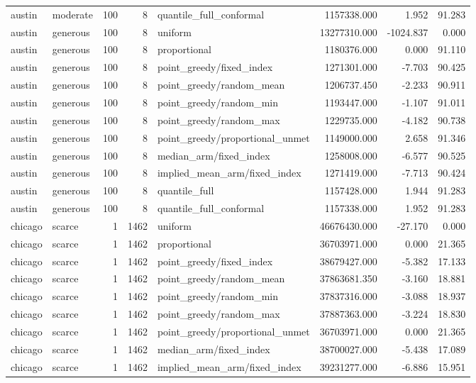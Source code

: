 \begin{tabular}{llrrlrrr}
austin & moderate & 100 & 8 & quantile\_full\_conformal & 1157338.000 & 1.952 & 91.283 \\
austin & generous & 100 & 8 & uniform & 13277310.000 & -1024.837 & 0.000 \\
austin & generous & 100 & 8 & proportional & 1180376.000 & 0.000 & 91.110 \\
austin & generous & 100 & 8 & point\_greedy/fixed\_index & 1271301.000 & -7.703 & 90.425 \\
austin & generous & 100 & 8 & point\_greedy/random\_mean & 1206737.450 & -2.233 & 90.911 \\
austin & generous & 100 & 8 & point\_greedy/random\_min & 1193447.000 & -1.107 & 91.011 \\
austin & generous & 100 & 8 & point\_greedy/random\_max & 1229735.000 & -4.182 & 90.738 \\
austin & generous & 100 & 8 & point\_greedy/proportional\_unmet & 1149000.000 & 2.658 & 91.346 \\
austin & generous & 100 & 8 & median\_arm/fixed\_index & 1258008.000 & -6.577 & 90.525 \\
austin & generous & 100 & 8 & implied\_mean\_arm/fixed\_index & 1271419.000 & -7.713 & 90.424 \\
austin & generous & 100 & 8 & quantile\_full & 1157428.000 & 1.944 & 91.283 \\
austin & generous & 100 & 8 & quantile\_full\_conformal & 1157338.000 & 1.952 & 91.283 \\
chicago & scarce & 1 & 1462 & uniform & 46676430.000 & -27.170 & 0.000 \\
chicago & scarce & 1 & 1462 & proportional & 36703971.000 & 0.000 & 21.365 \\
chicago & scarce & 1 & 1462 & point\_greedy/fixed\_index & 38679427.000 & -5.382 & 17.133 \\
chicago & scarce & 1 & 1462 & point\_greedy/random\_mean & 37863681.350 & -3.160 & 18.881 \\
chicago & scarce & 1 & 1462 & point\_greedy/random\_min & 37837316.000 & -3.088 & 18.937 \\
chicago & scarce & 1 & 1462 & point\_greedy/random\_max & 37887363.000 & -3.224 & 18.830 \\
chicago & scarce & 1 & 1462 & point\_greedy/proportional\_unmet & 36703971.000 & 0.000 & 21.365 \\
chicago & scarce & 1 & 1462 & median\_arm/fixed\_index & 38700027.000 & -5.438 & 17.089 \\
chicago & scarce & 1 & 1462 & implied\_mean\_arm/fixed\_index & 39231277.000 & -6.886 & 15.951 \\

\end{tabular}
